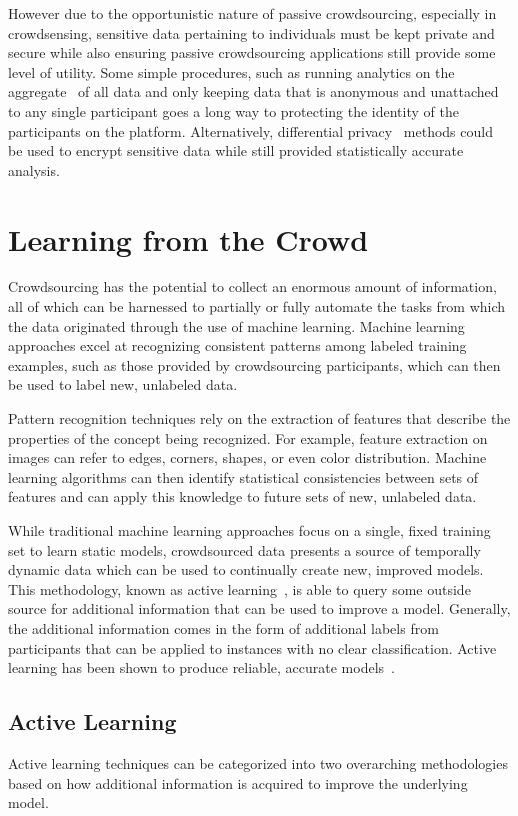 \documentclass[10pt,twocolumn]{article}
\begin{document}
However due to the opportunistic nature of passive crowdsourcing, 
especially in crowdsensing, sensitive data pertaining to individuals must
be kept private and secure while also ensuring passive crowdsourcing
applications still provide some level of utility. Some simple procedures,
such as running analytics on the aggregate~\cite{Ganti2011} of all 
data and only keeping data that is anonymous and unattached to any 
single participant goes a long way to protecting the identity of the 
participants on the platform. Alternatively, differential 
privacy~\cite{Dwork2006} methods could be used to encrypt 
sensitive data while still provided statistically accurate
analysis.

\section{Learning from the Crowd}
\label{sec:learning}
Crowdsourcing has the potential to collect an enormous amount of
information, all of which can be harnessed to partially or fully 
automate the tasks from which the data originated through the use of 
machine learning. Machine learning approaches excel at recognizing
consistent patterns among labeled training examples, such as those
provided by crowdsourcing participants, which can then be used to 
label new, unlabeled data.

Pattern recognition techniques rely on the extraction of features
that describe the properties of the concept being recognized. For
example, feature extraction on images can refer to edges, corners,
shapes, or even color distribution. Machine learning algorithms
can then identify statistical consistencies between sets of
features and can apply this knowledge to future sets of new,
unlabeled data.

While traditional machine learning approaches focus on a single,
fixed training set to learn static models, crowdsourced data presents
a source of temporally dynamic data which can be used to continually
create new, improved models. This methodology, known as active 
learning~\cite{Settles2010,Druck2009}, is able to query some outside
source for additional information that can be used to improve a model.
Generally, the additional information comes in the form of additional
labels from participants that can be applied to instances with no
clear classification. Active learning has been shown to produce reliable,
accurate models~\cite{Barrington2012,Brew2010}.


\subsection{Active Learning}
Active learning techniques can be categorized into two overarching 
methodologies based on how additional information is acquired to 
improve the underlying model. 
\end{document}
